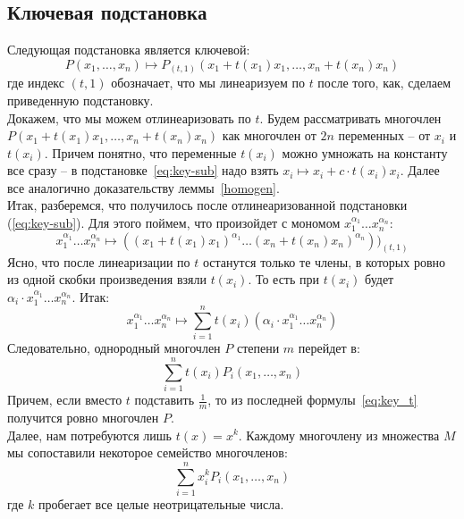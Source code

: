 \subsection{Ключевая подстановка}\label{subsec:key-substitution}
Следующая подстановка является ключевой:
\begin{equation}
    \label{eq:key-sub}
    P(x_1,\ldots,x_n)\mapsto P_{(t, 1)}(x_1+t(x_1)x_1,\ldots,x_n+t(x_n)x_n)
\end{equation}
где индекс $(t,1)$ обозначает, что мы линеаризуем по $t$ после того, как, сделаем приведенную подстановку.\\
Докажем, что мы можем отлинеаризовать по $t$.
Будем рассматривать многочлен $P(x_1+t(x_1)x_1,\ldots,x_n+t(x_n)x_n)$ как многочлен от $2n$ переменных -- от $x_i$ и $t(x_i)$.
Причем понятно, что переменные $t(x_i)$ можно умножать на константу все сразу -- в подстановке~\ref{eq:key-sub} надо взять $x_i\mapsto x_i+c\cdot t(x_i)x_i$.
Далее все аналогично доказательству леммы~\ref{homogen}.\\
Итак, разберемся, что получилось после отлинеаризованной подстановки (\ref{eq:key-sub}). Для этого поймем, что произойдет с мономом $x_1^{\alpha_1}\ldots x_n^{\alpha_n}$:
\[x_1^{\alpha_1}\ldots x_n^{\alpha_n}\mapsto ((x_1+t(x_1)x_1)^{\alpha_1}\ldots (x_n+t(x_n)x_n)^{\alpha_n}))_{(t,1)}\]Ясно, что после линеаризации по $t$ останутся только те члены, в которых ровно из одной скобки произведения взяли $t(x_i)$.
То есть при $t(x_i)$ будет $\alpha_i\cdot x_1^{\alpha_1}\ldots x_n^{\alpha_n}$.
Итак:
\begin{equation}
    \label{eq:key_monom}
    x_1^{\alpha_1}\ldots x_n^{\alpha_n}\mapsto\sum\limits_{i=1}^n t(x_i)(\alpha_i\cdot x_1^{\alpha_1}\ldots x_n^{\alpha_n})
\end{equation}
Следовательно, однородный многочлен $P$ степени $m$ перейдет в:
\begin{equation}
    \label{eq:key_t}
    \sum\limits_{i=1}^n t(x_i)P_i(x_1,\ldots,x_n)
\end{equation}
Причем, если вместо $t$ подставить $\frac{1}{m}$, то из последней формулы~\eqref{eq:key_t} получится ровно многочлен $P$.\\
Далее, нам потребуются лишь $t(x)=x^k$.
Каждому многочлену из множества $M$ мы сопоставили некоторое семейство многочленов:
\begin{equation}
    \label{eq:key_sum}
    \sum\limits_{i=1}^n x_i^k P_i(x_1,\ldots,x_n)
\end{equation}
где $k$ пробегает все целые неотрицательные числа.\\
